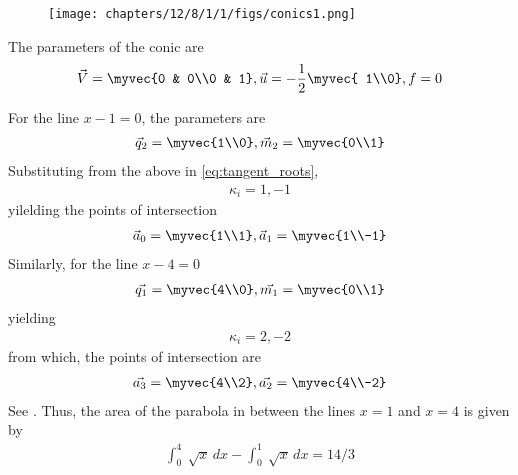 	\begin{figure}[H]
		\centering
 \texttt{[image: chapters/12/8/1/1/figs/conics1.png]}
		\caption{}
		\label{fig:12/8/1/1}
  	\end{figure}

The parameters of the conic are
\begin{align}
	\vec{V} = \myvec{0 & 0\\0 & 1},
	\vec{u} = -\frac{1}{2}\myvec{ 1\\0},
	f = 0
\end{align}
\iffalse
The point of intersection of the lines $x=1$ and $x=4$ to the parabola is given by


The points of intersection of the line 
\begin{align}
	L: \quad \vec{x} = \vec{q} + \kappa \vec{m} \quad \kappa \in \mathbf{R}
\label{eq:conic_tangent}
\end{align}
with the conic section are given by
\begin{align}
\vec{x}_i = \vec{q} + \kappa_i \vec{m}
\label{eq:conic_tangent_pts}
\end{align}
%
where
{\tiny
\begin{multline}
\kappa_i = \frac{1}
{
\vec{m}^T\vec{V}\vec{m}
}
\lbrak{-\vec{m}^T\brak{\vec{V}\vec{q}+\vec{u}}}
\\
\pm
\rbrak{\sqrt{
\sbrak{
\vec{m}^T\brak{\vec{V}\vec{q}+\vec{u}}
}^2
-
\brak
{
\vec{q}^T\vec{V}\vec{q} + 2\vec{u}^T\vec{q} +f
}
\brak{\vec{m}^T\vec{V}\vec{m}}
}
}
\label{eq:tangent_roots}
\end{multline}
}
\fi
For the line $x-1=0$, the parameters are  
\begin{align}
	\vec{q}_2=\myvec{1\\0},
	\vec{m}_2=\myvec{0\\1}
\end{align}
Substituting from the above in 
\eqref{eq:tangent_roots},
\begin{align}
\kappa_i=1,-1
\end{align}
yilelding 
the points of intersection 
\begin{align}
	\vec{a}_0=\myvec{1\\1},
	\vec{a}_1=\myvec{1\\-1}
\end{align}
Similarly, 
for the line $x-4=0$ 
\begin{align}
\vec{q_1}=\myvec{4\\0},
\vec{m_1}=\myvec{0\\1}
\end{align}
yielding
\begin{align}
\kappa_i=2,-2
\end{align}
from which, the points of 
intersection are
\begin{align}
\vec{a_3}=\myvec{4\\2},
\vec{a_2}=\myvec{4\\-2}
\end{align}
		See .
Thus, 
the area of the parabola in between the lines $x=1$ and $x=4$ is given by
\begin{align}
\int_{0}^{4} \ \sqrt{x} \,dx-\int_{0}^{1} \ \sqrt{x} \,dx
=14/3
\end{align}
